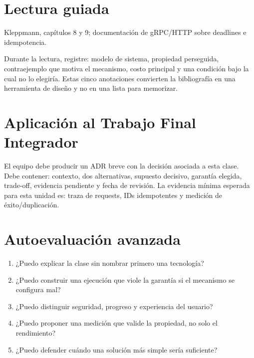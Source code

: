 \documentclass[variant=apuntes,cover=institutional,mode=screen]{ua-engineering-v6-article}
\begin{document}
\section{Lectura guiada}
Kleppmann, capítulos 8 y 9; documentación de gRPC/HTTP sobre deadlines e idempotencia.

Durante la lectura, registre: modelo de sistema, propiedad perseguida, contraejemplo que motiva el mecanismo, costo principal y una condición bajo la cual no lo elegiría. Estas cinco anotaciones convierten la bibliografía en una herramienta de diseño y no en una lista para memorizar.

\section{Aplicación al Trabajo Final Integrador}
El equipo debe producir un ADR breve con la decisión asociada a esta clase. Debe contener: contexto, dos alternativas, supuesto decisivo, garantía elegida, trade-off, evidencia pendiente y fecha de revisión. La evidencia mínima esperada para esta unidad es: traza de requests, IDs idempotentes y medición de éxito/duplicación.

\section{Autoevaluación avanzada}
\begin{enumerate}
\item ¿Puedo explicar la clase sin nombrar primero una tecnología?
\item ¿Puedo construir una ejecución que viole la garantía si el mecanismo se configura mal?
\item ¿Puedo distinguir seguridad, progreso y experiencia del usuario?
\item ¿Puedo proponer una medición que valide la propiedad, no solo el rendimiento?
\item ¿Puedo defender cuándo una solución más simple sería suficiente?
\end{enumerate}
\end{document}
